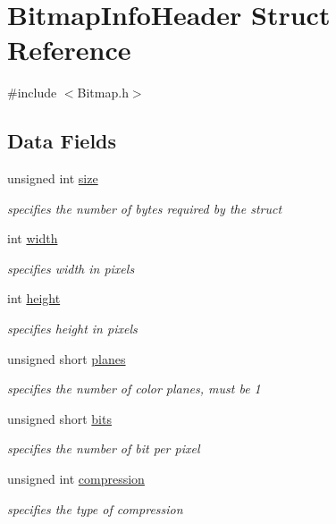 \hypertarget{struct_bitmap_info_header}{}\section{Bitmap\+Info\+Header Struct Reference}
\label{struct_bitmap_info_header}


{\ttfamily \#include $<$Bitmap.\+h$>$}

\subsection*{Data Fields}
\begin{DoxyCompactItemize}
\item 
unsigned int \hyperlink{group___bitmap_gaac913b3a1f6ef005d66bf7a84428773e}{size}
\begin{DoxyCompactList}\small\item\em specifies the number of bytes required by the struct \end{DoxyCompactList}\item 
int \hyperlink{group___bitmap_ga2474a5474cbff19523a51eb1de01cda4}{width}
\begin{DoxyCompactList}\small\item\em specifies width in pixels \end{DoxyCompactList}\item 
int \hyperlink{group___bitmap_gad12fc34ce789bce6c8a05d8a17138534}{height}
\begin{DoxyCompactList}\small\item\em specifies height in pixels \end{DoxyCompactList}\item 
unsigned short \hyperlink{group___bitmap_ga8c89d091e05544a82dc2398eed99634f}{planes}
\begin{DoxyCompactList}\small\item\em specifies the number of color planes, must be 1 \end{DoxyCompactList}\item 
unsigned short \hyperlink{group___bitmap_ga47d1d4d776f8fd3bb0f7dbc3c5aeb534}{bits}
\begin{DoxyCompactList}\small\item\em specifies the number of bit per pixel \end{DoxyCompactList}\item 
unsigned int \hyperlink{group___bitmap_gad180079f62b44e49ec672c9ef6e078b3}{compression}
\begin{DoxyCompactList}\small\item\em specifies the type of compression \end{DoxyCompactList}\item 

\end{DoxyCompactItemize}
